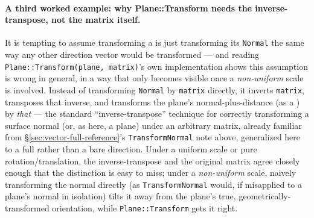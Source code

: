 \paragraph{A third worked example: why Plane::Transform needs the inverse-transpose, not the matrix itself.}
It is tempting to assume transforming a  is just transforming its
\texttt{Normal} the same way any other direction vector would be transformed --- and reading
\texttt{Plane::Transform(plane, matrix)}'s own implementation shows this assumption is wrong in
general, in a way that only becomes visible once a \emph{non-uniform} scale is involved.
Instead of transforming \texttt{Normal} by \texttt{matrix} directly, it inverts \texttt{matrix},
transposes that inverse, and transforms the plane's normal-plus-distance
(as a ) by \emph{that} --- the standard ``inverse-transpose'' technique for
correctly transforming a surface normal (or, as here, a plane) under an arbitrary matrix,
already familiar from \S\ref{sec:vector-full-reference}'s \texttt{TransformNormal} note above,
generalized here to a full  rather than a bare direction. Under a uniform scale
or pure rotation/translation, the inverse-transpose and the original matrix agree closely
enough that the distinction is easy to miss; under a \emph{non-uniform} scale, naively
transforming the normal directly (as \texttt{TransformNormal} would, if misapplied to a plane's
normal in isolation) tilts it away from the plane's true, geometrically-transformed
orientation, while \texttt{Plane::Transform} gets it right.

